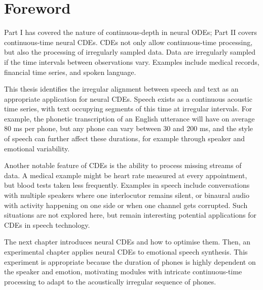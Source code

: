 \chapter*{Foreword}
Part I has covered the nature of continuous-depth in neural \acp{ODE}; Part II covers continuous-time neural \acp{CDE}. \acp{CDE} not only allow continuous-time processing, but also the processing of irregularly sampled data. Data are irregularly sampled if the time intervals between observations vary. Examples include medical records, financial time series, and spoken language.

This thesis identifies the irregular alignment between speech and text as an appropriate application for neural \acp{CDE}. Speech exists as a continuous acoustic time series, with text occupying segments of this time at irregular intervals. For example, the phonetic transcription of an English utterance will have on average 80 ms per phone, but any phone can vary between 30 and 200 ms, and the style of speech can further affect these durations, for example through speaker and emotional variability.

Another notable feature of \acp{CDE} is the ability to process missing streams of data. A medical example might be heart rate measured at every appointment, but blood tests taken less frequently. Examples in speech include conversations with multiple speakers where one interlocutor remains silent, or binaural audio with activity happening on one side or when one channel gets corrupted. Such situations are not explored here, but remain interesting potential applications for \acp{CDE} in speech technology.

The next chapter introduces neural \acp{CDE} and how to optimise them. Then, an experimental chapter applies neural \acp{CDE} to emotional speech synthesis. This experiment is appropriate because the duration of phones is highly dependent on the speaker and emotion, motivating modules with intricate continuous-time processing to adapt to the acoustically irregular sequence of phones.
